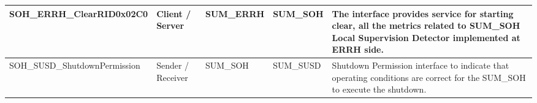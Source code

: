 \begin{longtable}{|l|l|l|l|l|}
\begin{minipage}{0.42\linewidth}\raggedright\vspace{.75ex}SOH\_ERRH\_ClearRID0x02C0\vspace{.75ex}\end{minipage} & \begin{minipage}{0.07\linewidth}\raggedright\vspace{.75ex}Client / Server\vspace{.75ex}\end{minipage} & \begin{minipage}{0.10\linewidth}\raggedright\vspace{.75ex}SUM\_ERRH\vspace{.75ex}\end{minipage} & \begin{minipage}{0.10\linewidth}\raggedright\vspace{.75ex}SUM\_SOH\vspace{.75ex}\end{minipage} & \begin{minipage}{0.17\linewidth}\raggedright\vspace{.75ex}The interface provides service for starting clear, all the metrics related to SUM\_SOH Local Supervision Detector implemented at ERRH side.\vspace{.75ex}\end{minipage}\\\hline
\begin{minipage}{0.42\linewidth}\raggedright\vspace{.75ex}SOH\_SUSD\_ShutdownPermission\vspace{.75ex}\end{minipage} & \begin{minipage}{0.07\linewidth}\raggedright\vspace{.75ex}Sender / Receiver\vspace{.75ex}\end{minipage} & \begin{minipage}{0.10\linewidth}\raggedright\vspace{.75ex}SUM\_SOH\vspace{.75ex}\end{minipage} & \begin{minipage}{0.10\linewidth}\raggedright\vspace{.75ex}SUM\_SUSD\vspace{.75ex}\end{minipage} & \begin{minipage}{0.17\linewidth}\raggedright\vspace{.75ex}Shutdown Permission interface to indicate that operating conditions are correct for the SUM\_SOH to execute the shutdown.\vspace{.75ex}\end{minipage}\\\hline
\end{longtable}